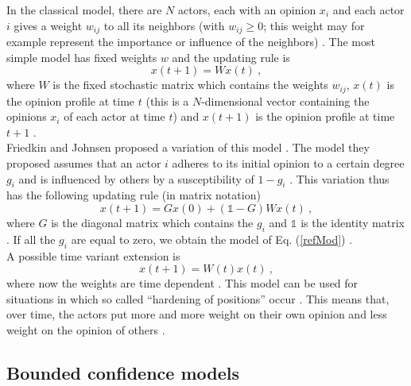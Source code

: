 \documentclass[11 pt , letterpaper , twoside , openright]{book}
\begin{document}
In the classical model, there are $N$ actors, each with an opinion $x_i$ and each actor $i$ gives a weight $w_{ij}$ to all its neighbors (with $w_{ij} \geqslant 0$; this weight may for example represent the importance or influence of the neighbors) \cite{Krause2002}. The most simple model has fixed weights $w$ and the updating rule is
\begin{equation}\label{refMod}
	x(t+1) = W x(t) \ ,
\end{equation}
where $W$ is the fixed stochastic matrix which contains the weights $w_{ij}$, $x(t)$ is the opinion profile at time $t$ (this is a $N$-dimensional vector containing the opinions $x_i$ of each actor at time $t$) and $x(t+1)$ is the opinion profile at time $t+1$ \cite{Krause2002}.\\
\newline
Friedkin and Johnsen proposed a variation of this model \cite{Friedkin1990}\cite{Friedkin1999}. The model they proposed assumes that an actor $i$ adheres to its initial opinion to a certain degree $g_i$ and is influenced by others by a susceptibility of $1-g_i$ \cite{Krause2002}. This variation thus has the following updating rule (in matrix notation)
\begin{equation}
	x(t+1) = Gx(0) + (\mathbb{1}-G)Wx(t) \ ,
\end{equation}
where $G$ is the diagonal matrix which contains the $g_i$ and $\mathbb{1}$ is the identity matrix  \cite{Krause2002}. If all the $g_i$ are equal to zero, we obtain the model of Eq. (\ref{refMod}) \cite{Krause2002}.\\
\newline
A possible time variant extension is
\begin{equation}
	x(t+1) = W(t)x(t) \ ,
\end{equation}
where now the weights are time dependent \cite{Krause2002}. This model can be used for situations in which so called ``hardening of positions'' occur \cite{Krause2002}. This means that, over time, the actors put more and more weight on their own opinion and less weight on the opinion of others \cite{Krause2002}. 

\subsection{Bounded confidence models}\label{bounded}
\end{document}
